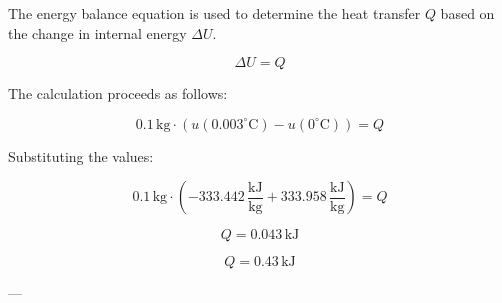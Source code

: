 The energy balance equation is used to determine the heat transfer \( Q \) based on the change in internal energy \( \Delta U \).  

\[
\Delta U = Q
\]

The calculation proceeds as follows:  

\[
0.1 \, \text{kg} \cdot \left( u(0.003^\circ\text{C}) - u(0^\circ\text{C}) \right) = Q
\]

Substituting the values:  

\[
0.1 \, \text{kg} \cdot \left( -333.442 \, \frac{\text{kJ}}{\text{kg}} + 333.958 \, \frac{\text{kJ}}{\text{kg}} \right) = Q
\]

\[
Q = 0.043 \, \text{kJ}
\]

\[
Q = 0.43 \, \text{kJ}
\]

---